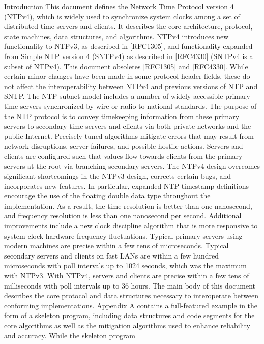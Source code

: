 Introduction
 This document defines the Network Time Protocol version 4 (NTPv4),
 which is widely used to synchronize system clocks among a set of
 distributed time servers and clients. It describes the core
 architecture, protocol, state machines, data structures, and
 algorithms. NTPv4 introduces new functionality to NTPv3, as
 described in [RFC1305], and functionality expanded from Simple NTP
 version 4 (SNTPv4) as described in [RFC4330] (SNTPv4 is a subset of
 NTPv4). This document obsoletes [RFC1305] and [RFC4330]. While
 certain minor changes have been made in some protocol header fields,
 these do not affect the interoperability between NTPv4 and previous
 versions of NTP and SNTP.
 The NTP subnet model includes a number of widely accessible primary
 time servers synchronized by wire or radio to national standards.
 The purpose of the NTP protocol is to convey timekeeping information
 from these primary servers to secondary time servers and clients via
 both private networks and the public Internet. Precisely tuned
 algorithms mitigate errors that may result from network disruptions,
 server failures, and possible hostile actions. Servers and clients
 are configured such that values flow towards clients from the primary
 servers at the root via branching secondary servers.
 The NTPv4 design overcomes significant shortcomings in the NTPv3
 design, corrects certain bugs, and incorporates new features. In
 particular, expanded NTP timestamp definitions encourage the use of
 the floating double data type throughout the implementation. As a
 result, the time resolution is better than one nanosecond, and
 frequency resolution is less than one nanosecond per second.
 Additional improvements include a new clock discipline algorithm that
 is more responsive to system clock hardware frequency fluctuations.
 Typical primary servers using modern machines are precise within a
 few tens of microseconds. Typical secondary servers and clients on
 fast LANs are within a few hundred microseconds with poll intervals
 up to 1024 seconds, which was the maximum with NTPv3. With NTPv4,
 servers and clients are precise within a few tens of milliseconds
 with poll intervals up to 36 hours.
 The main body of this document describes the core protocol and data
 structures necessary to interoperate between conforming
 implementations. Appendix A contains a full-featured example in the
 form of a skeleton program, including data structures and code
 segments for the core algorithms as well as the mitigation algorithms
 used to enhance reliability and accuracy. While the skeleton program
